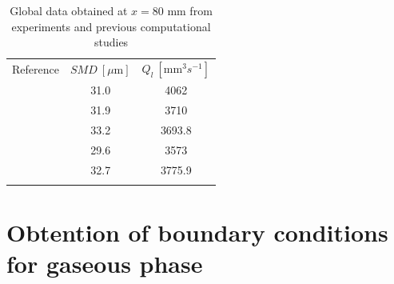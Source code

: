 \begin{table}[!h]
\centering
\caption{Global data obtained at $x = 80$ mm from experiments and previous computational studies }
\begin{tabular}{ccc}
\thickhline
Reference & $SMD~\left[ \mu \mathrm{m}\right]$  & $Q_l~\left[ \mathrm{mm}^3 s^{-1} \right]$ \\
\thickhline
{} & 31.0 &   4062  \\  
 & 31.9  & 3710  \\
 & 33.2 &  3693.8  \\
 & 29.6  & 3573  \\
 & 32.7  & 3775.9  \\
\thickhline
\end{tabular}
\label{tab:previous_numerical_studies_on_jicf_dlr_values}
\end{table}






\section{Obtention of boundary conditions for gaseous phase}
\label{sec:ch6_BC_gaseous_phase}

